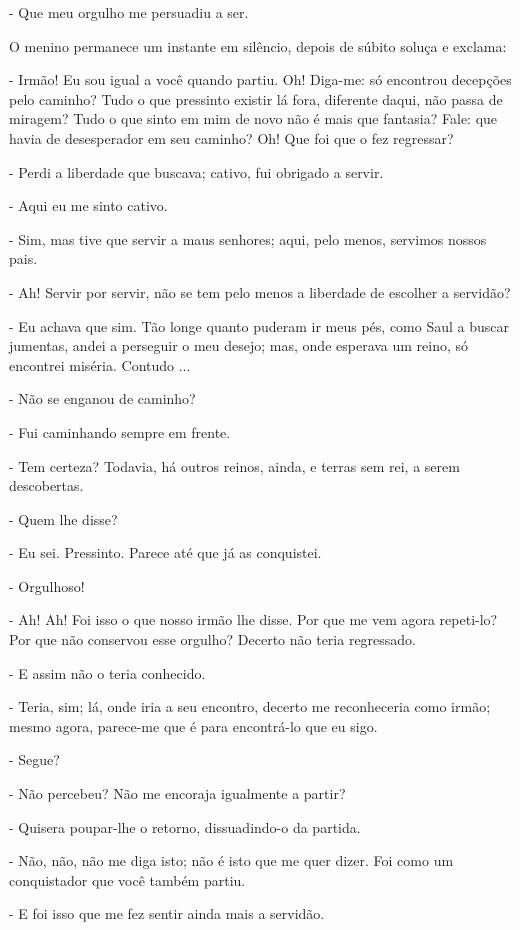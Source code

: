 - Que meu orgulho me persuadiu a ser.

O menino permanece um instante em silêncio, depois de súbito soluça e
exclama:

- Irmão! Eu sou igual a você quando partiu. Oh! Diga-me: só encontrou
decepções pelo caminho? Tudo o que pressinto existir lá fora, diferente
daqui, não passa de miragem? Tudo o que sinto em mim de novo não é mais
que fantasia? Fale: que havia de desesperador em seu caminho? Oh! Que
foi que o fez regressar?

- Perdi a liberdade que buscava; cativo, fui obrigado a servir.

- Aqui eu me sinto cativo.

- Sim, mas tive que servir a maus senhores; aqui, pelo menos, servimos
nossos pais.

- Ah! Servir por servir, não se tem pelo menos a liberdade de escolher a
servidão?

- Eu achava que sim. Tão longe quanto puderam ir meus pés, como Saul a
buscar jumentas, andei a perseguir o meu desejo; mas, onde esperava um
reino, só encontrei miséria. Contudo ...

- Não se enganou de caminho?

- Fui caminhando sempre em frente.

- Tem certeza? Todavia, há outros reinos, ainda, e terras sem rei, a
serem descobertas.

- Quem lhe disse?

- Eu sei. Pressinto. Parece até que já as conquistei.

- Orgulhoso!

- Ah! Ah! Foi isso o que nosso irmão lhe disse. Por que me vem agora
repeti-lo? Por que não conservou esse orgulho? Decerto não teria
regressado.

- E assim não o teria conhecido.

- Teria, sim; lá, onde iria a seu encontro, decerto me reconheceria como
irmão; mesmo agora, parece-me que é para encontrá-lo que eu sigo.

- Segue?

- Não percebeu? Não me encoraja igualmente a partir?

- Quisera poupar-lhe o retorno, dissuadindo-o da partida.

- Não, não, não me diga isto; não é isto que me quer dizer. Foi como um
conquistador que você também partiu.

- E foi isso que me fez sentir ainda mais a servidão.


